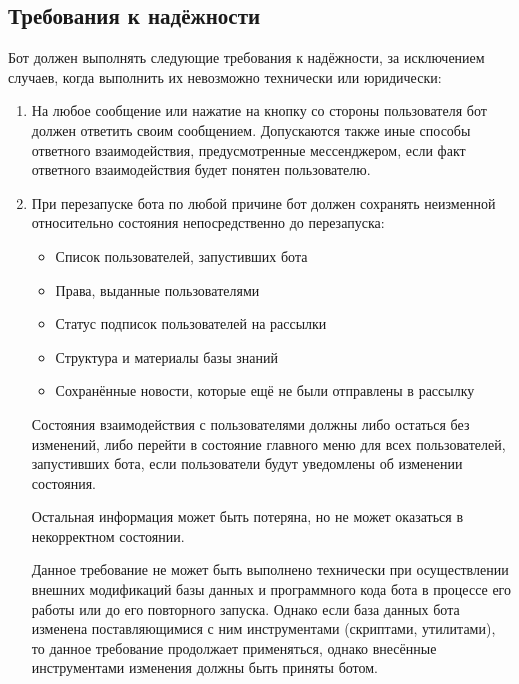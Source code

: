 \subsection{Требования к надёжности}
\label{sec:req:reliab}
Бот должен выполнять следующие требования к надёжности, за исключением случаев,
когда выполнить их невозможно технически или юридически:
\begin{enumerate}
    \item
        На любое сообщение или нажатие на кнопку со стороны пользователя бот должен ответить
        своим сообщением. Допускаются также иные способы ответного взаимодействия, предусмотренные
        мессенджером, если факт ответного взаимодействия будет понятен пользователю.
    \item
        При перезапуске бота по любой причине бот должен сохранять неизменной относительно
        состояния непосредственно до перезапуска:
        \begin{itemize}
            \item
                Список пользователей, запустивших бота
            \item
                Права, выданные пользователями
            \item
                Статус подписок пользователей на рассылки
            \item
                Структура и материалы базы знаний
            \item
                Сохранённые новости, которые ещё не были отправлены в рассылку
        \end{itemize}

        Состояния взаимодействия с пользователями должны либо остаться без изменений, либо перейти
        в состояние главного меню для всех пользователей, запустивших бота, если
        пользователи будут уведомлены об изменении состояния.

        Остальная информация может быть потеряна, но не может оказаться в некорректном состоянии.

        Данное требование не может быть выполнено технически при осуществлении внешних модификаций базы
        данных и программного кода бота в процессе его работы или до его повторного запуска.
        Однако если база данных бота изменена поставляющимися с ним инструментами (скриптами, утилитами),
        то данное требование продолжает применяться, однако внесённые инструментами изменения должны
        быть приняты ботом.


\end{enumerate}
